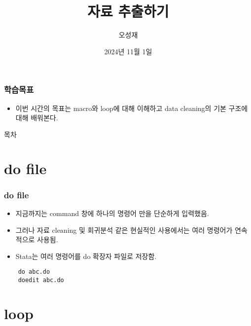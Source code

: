 \documentclass[aspectratio=169,xcolor=dvipsnames,handout]{beamer}
\title{자료 추출하기}
\author{오성재}
\institute[CNU]
{\relax
    전북대학교 Stata 특강\
}
\date{2024년 11월 1일}
\begin{document}

\frame{\titlepage}

\begin{frame}
\frametitle{학습목표}
    \begin{itemize}[<+->]
    \item 이번 시간의 목표는 macro와 loop에 대해 이해하고 data cleaning의 기본 구조에 대해 배워본다.
    \end{itemize}
\end{frame}

\begin{frame}{목차}
    \small
    \tableofcontents[hideallsubsections]
\end{frame}

\section{do file}

\begin{frame}[fragile]
    \frametitle{do file}
    \begin{itemize}[<+->]
        \item 지금까지는 command 창에 하나의 명령어 만을 단순하게 입력했음.
        \item 그러나 자료 cleaning 및 회귀분석 같은 현실적인 사용에서는 여러 명령어가 연속적으로 사용됨.
        \item Stata는 여러 명령어를 do 확장자 파일로 저장함.
    \end{itemize}
    \begin{verbatim}
    do abc.do
    doedit abc.do
    \end{verbatim}
\end{frame}

\section{loop}
\end{document}
